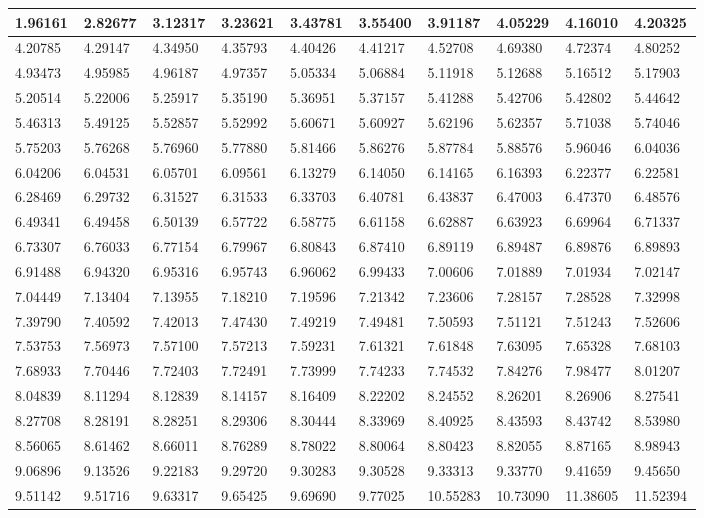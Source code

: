 \begin{changemargin}{-4cm}{0cm}\small{%
\begin{tabular}{|p{0.08\linewidth}|p{0.08\linewidth}|p{0.08\linewidth}|p{0.08\linewidth}|p{0.08\linewidth}|p{0.08\linewidth}|p{0.08\linewidth}|p{0.08\linewidth}|p{0.08\linewidth}|p{0.08\linewidth}|}%
\hline%
1.96161&2.82677&3.12317&3.23621&3.43781&3.55400&3.91187&4.05229&4.16010&4.20325\\%
\hline%
4.20785&4.29147&4.34950&4.35793&4.40426&4.41217&4.52708&4.69380&4.72374&4.80252\\%
\hline%
4.93473&4.95985&4.96187&4.97357&5.05334&5.06884&5.11918&5.12688&5.16512&5.17903\\%
\hline%
5.20514&5.22006&5.25917&5.35190&5.36951&5.37157&5.41288&5.42706&5.42802&5.44642\\%
\hline%
5.46313&5.49125&5.52857&5.52992&5.60671&5.60927&5.62196&5.62357&5.71038&5.74046\\%
\hline%
5.75203&5.76268&5.76960&5.77880&5.81466&5.86276&5.87784&5.88576&5.96046&6.04036\\%
\hline%
6.04206&6.04531&6.05701&6.09561&6.13279&6.14050&6.14165&6.16393&6.22377&6.22581\\%
\hline%
6.28469&6.29732&6.31527&6.31533&6.33703&6.40781&6.43837&6.47003&6.47370&6.48576\\%
\hline%
6.49341&6.49458&6.50139&6.57722&6.58775&6.61158&6.62887&6.63923&6.69964&6.71337\\%
\hline%
6.73307&6.76033&6.77154&6.79967&6.80843&6.87410&6.89119&6.89487&6.89876&6.89893\\%
\hline%
6.91488&6.94320&6.95316&6.95743&6.96062&6.99433&7.00606&7.01889&7.01934&7.02147\\%
\hline%
7.04449&7.13404&7.13955&7.18210&7.19596&7.21342&7.23606&7.28157&7.28528&7.32998\\%
\hline%
7.39790&7.40592&7.42013&7.47430&7.49219&7.49481&7.50593&7.51121&7.51243&7.52606\\%
\hline%
7.53753&7.56973&7.57100&7.57213&7.59231&7.61321&7.61848&7.63095&7.65328&7.68103\\%
\hline%
7.68933&7.70446&7.72403&7.72491&7.73999&7.74233&7.74532&7.84276&7.98477&8.01207\\%
\hline%
8.04839&8.11294&8.12839&8.14157&8.16409&8.22202&8.24552&8.26201&8.26906&8.27541\\%
\hline%
8.27708&8.28191&8.28251&8.29306&8.30444&8.33969&8.40925&8.43593&8.43742&8.53980\\%
\hline%
8.56065&8.61462&8.66011&8.76289&8.78022&8.80064&8.80423&8.82055&8.87165&8.98943\\%
\hline%
9.06896&9.13526&9.22183&9.29720&9.30283&9.30528&9.33313&9.33770&9.41659&9.45650\\%
\hline%
9.51142&9.51716&9.63317&9.65425&9.69690&9.77025&10.55283&10.73090&11.38605&11.52394\\%
\hline%
\end{tabular}%
\newline%
\newline%
%
}\end{changemargin}%
